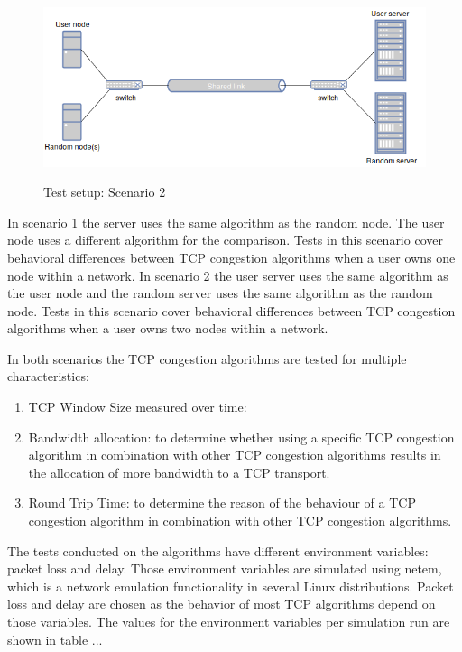 \documentclass{article}
\begin{document}
	\begin{figure}[H] 
		\centering
			\caption{Test setup: Scenario 2}
			\includegraphics[scale=0.5]{figs/setup2.png}
  		\label{fig:setup2}
	\end{figure}
	
	In scenario 1 the server uses the same algorithm as the random node. The user node uses a different algorithm for the comparison. Tests in this scenario cover behavioral differences between TCP congestion algorithms when a user owns one node within a network. In scenario 2 the user server uses the same algorithm as the user node and the random server uses the same algorithm as the random node. Tests in this scenario cover behavioral differences between TCP congestion algorithms when a user owns two nodes within a network.
	
	In both scenarios the TCP congestion algorithms are tested for multiple characteristics:
	\begin{enumerate}
		\item TCP Window Size measured over time: 
		\item Bandwidth allocation: to determine whether using a specific TCP congestion algorithm in combination with other TCP congestion algorithms results in the allocation of more bandwidth to a TCP transport.
		\item Round Trip Time: to determine the reason of the behaviour of a TCP congestion algorithm in combination with other TCP congestion algorithms.
	\end{enumerate}
	
	The tests conducted on the algorithms have different environment variables: packet loss and delay. Those environment variables are simulated using netem, which is a network emulation functionality in several Linux distributions. Packet loss and delay are chosen as the behavior of most TCP algorithms depend on those variables. The values for the environment variables per simulation run are shown in table ...		
	
\end{document}
